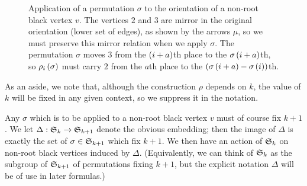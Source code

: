 \documentclass[distribution,draft]{brandiss} %
\numberwithin{section}{chapter}
\numberwithin{figure}{chapter}
\begin{document}
\begin{figure}[htbp]
  \centering
  \caption[The permutation-modifying map $\rho$]{Application of a permutation $\sigma$ to the orientation of a non-root black vertex $v$.
    The vertices $2$ and $3$ are mirror in the original orientation (lower set of edges), as shown by the arrows $\mu$, so we must preserve this mirror relation when we apply $\sigma$.
    The permutation $\sigma$ moves $3$ from the $\left( {i+a} \right)$th place to the $\sigma \left( {i+a} \right)$th, so $\rho_{i} \left( {\sigma} \right)$ must carry $2$ from the $a$th place to the $\left( {\sigma \left( {i+a} \right) - \sigma \left( {i} \right)} \right)$th.}
  \label{fig:rhoapp}
\end{figure}

As an aside, we note that, although the construction $\rho$ depends on $k$, the value of $k$ will be fixed in any given context, so we suppress it in the notation.

Any $\sigma$ which is to be applied to a non-root black vertex $v$ must of course fix $k+1$.
We let $\Delta:  \mathfrak{S}_{k}  \to  \mathfrak{S}_{k+1} $ denote the obvious embedding; then the image of $\Delta$ is exactly the set of $\sigma \in  \mathfrak{S}_{k+1} $ which fix $k+1$.
We then have an action of $ \mathfrak{S}_{k} $ on non-root black vertices induced by $\Delta$.
(Equivalently, we can think of $ \mathfrak{S}_{k} $ as the subgroup of $ \mathfrak{S}_{k+1} $ of permutations fixing $k+1$, but the explicit notation $\Delta$ will be of use in later formulas.)
\end{document}
